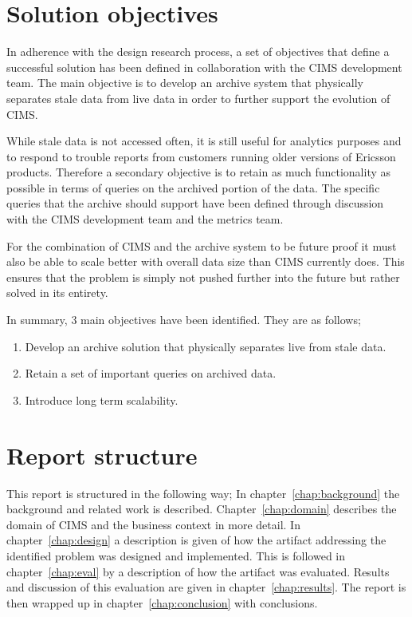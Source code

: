 \section{Solution objectives}
\label{objectives}
In adherence with the design research process, a set of objectives that define a successful solution has been defined in collaboration with the CIMS development team. The main objective is to develop an archive system that physically separates stale data from live data in order to further support the evolution of CIMS.

While stale data is not accessed often, it is still useful for analytics purposes and to respond to trouble reports from customers running older versions of Ericsson products. Therefore a secondary objective is to retain as much functionality as possible in terms of queries on the archived portion of the data. The specific queries that the archive should support have been defined through discussion with the CIMS development team and the metrics team.

For the combination of CIMS and the archive system to be future proof it must also be able to scale better with overall data size than CIMS currently does. This ensures that the problem is simply not pushed further into the future but rather solved in its entirety.

In summary, 3 main objectives have been identified. They are as follows;
\begin{enumerate}
\item Develop an archive solution that physically separates live from stale data.
\item Retain a set of important queries on archived data.
\item Introduce long term scalability.
\end{enumerate}


\section{Report structure}
This report is structured in the following way; In chapter~\ref{chap:background} the background and related work is described. Chapter~\ref{chap:domain} describes the domain of CIMS and the business context in more detail. In chapter~\ref{chap:design} a description is given of how the artifact addressing the identified problem was designed and implemented.
This is followed in chapter~\ref{chap:eval} by a description of how the artifact was evaluated. Results and discussion of this evaluation are given in chapter~\ref{chap:results}. The report is then wrapped up in chapter~\ref{chap:conclusion} with conclusions.

